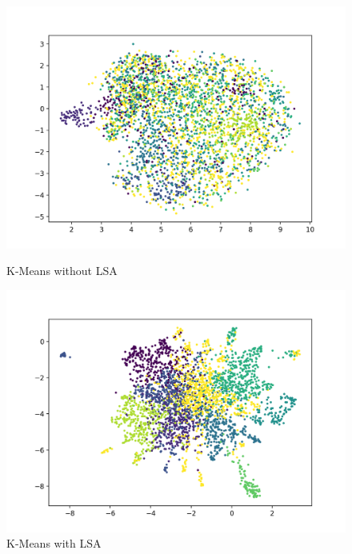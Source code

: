 \documentclass[12pt]{article}
\begin{document}
\begin{figure}[!htb]
	\begin{minipage}[b]{0.5\textwidth}
		\includegraphics[width=.9\linewidth]{km-no-lsa}	
		\caption{K-Means without LSA} 
		\label{fig:km-no-lsa}
	\end{minipage}\hfill
	\begin{minipage}[b]{0.5\textwidth}
		\includegraphics[width=.9\linewidth]{lsa}	
		\caption{K-Means with LSA} 
		\label{fig:lsa}
	\end{minipage}
\end{figure}
\end{document}
